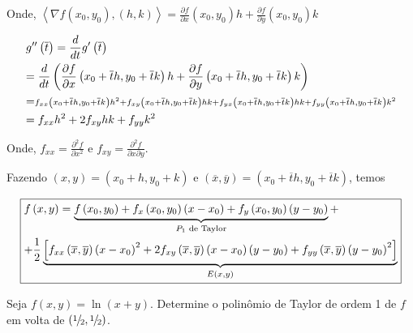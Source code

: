 \documentclass{book}
\begin{document}
Onde, $\left\langle {\nabla f\left( {x_0 ,y_0 } \right),\left( {h,k} \right)} \right\rangle  = \frac{{\partial f}}
{{\partial x}}\left( {x_0 ,y_0 } \right)h + \frac{{\partial f}}
{{\partial y}}\left( {x_0 ,y_0 } \right)k$

\[
\begin{gathered}
g''\left( {\overline t } \right) = \frac{d}
{{dt}}g'\left( {\overline t } \right) \hfill \\
= \frac{d}
{{dt}}\left( {\frac{{\partial f}}
{{\partial x}}\left( {x_0  + \overline t h,y_0  + \overline t k} \right)h + \frac{{\partial f}}
{{\partial y}}\left( {x_0  + \overline t h,y_0  + \overline t k} \right)k} \right) \hfill \\
   = \scriptstyle{f_{xx} \left( {x_0  + \overline t h,y_0  + \overline t k} \right)h^2  + f_{xy} \left( {x_0  + \overline t h,y_0  + \overline t k} \right)hk + f_{yx} \left( {x_0  + \overline t h,y_0  + \overline t k} \right)hk + f_{yy} \left( {x_0  + \overline t h,y_0  + \overline t k} \right)k^2}  \hfill \\
= f_{xx} h^2  + 2f_{xy} hk + f_{yy} k^2  \hfill \\
\end{gathered}
\]

Onde, $f_{xx}  = \frac{{\partial ^2 f}}{{\partial x^2 }}$ e $f_{xy}  = \frac{{\partial ^2 f}}{{\partial x\partial y}}$.

Fazendo $\left( {x,y} \right) = \left( {x_0  + h,y_0  + k} \right)$ e $\left( {\overline x ,\overline y } \right) = \left( {x_0  + \overline t h,y_0  + \overline t k} \right)$, temos

\[\boxed{
\begin{gathered}
  f\left( {x,y} \right) = \underbrace {f\left( {x_0 ,y_0 } \right) + f_x \left( {x_0 ,y_0 } \right)\left( {x - x_0 } \right) + f_y \left( {x_0 ,y_0 } \right)\left( {y - y_0 } \right)}_{P_1 {\text{ de Taylor}}} +  \hfill \\
+ \frac{1}
{2}\underbrace {\left[ {f_{xx} \left( {\overline x ,\overline y } \right)\left( {x - x_0 } \right)^2  + 2f_{xy} \left( {\overline x ,\overline y } \right)\left( {x - x_0 } \right)\left( {y - y_0 } \right) + f_{yy} \left( {\overline x ,\overline y } \right)\left( {y - y_0 } \right)^2 } \right]}_{E\left( {x,y} \right)} \hfill \\
\end{gathered}
}\]

\begin{ex}
    Seja $f\left( {x,y} \right) = \ln \left( {x + y} \right)$. Determine o polin\^omio de Taylor de ordem 1 de $f$ em volta de $\left( {{\raise0.5ex\hbox{$\scriptstyle 1$}
\kern-0.1em/\kern-0.15em
\lower0.25ex\hbox{$\scriptstyle 2$}},{\raise0.5ex\hbox{$\scriptstyle 1$}
\kern-0.1em/\kern-0.15em
\lower0.25ex\hbox{$\scriptstyle 2$}}} \right)$.
\end{ex}
\end{document}
